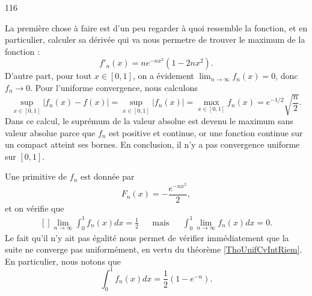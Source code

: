 

\begin{corrige}{116}

La première chose à faire est d'un peu regarder à quoi ressemble la fonction, et en particulier, calculer sa dérivée qui va nous permetre de trouver le maximum de la fonction :
\begin{equation}
	f'_n(x)=n e^{-nx^2}(1-2nx^2).
\end{equation}
D'autre part, pour tout $x\in[0,1]$, on a évidement $\lim_{n\to\infty}f_n(x)=0$, donc $f_n\to 0$. Pour l'uniforme convergence, nous calculons
\begin{equation}
	\sup_{x\in[0,1]}| f_n(x)-f(x) |=\sup_{x\in[0,1]}| f_n(x) |=\max_{x\in[0,1]}f_n(x)= e^{-1/2}\sqrt{\frac{ n }{ 2 }}.
\end{equation}
Dans ce calcul, le suprémum de la valeur absolue est devenu le maximum sans valeur absolue parce que $f_n$ est positive et continue, or une fonction continue sur un compact atteint ses bornes. En conclusion, il n'y a pas convergence uniforme sur $[0,1]$.

Une primitive de $f_n$ est donnée par
\begin{equation}
	F_n(x)=-\frac{  e^{-nx^2} }{2},
\end{equation}
et on vérifie que 
\begin{equation}
	\begin{aligned}[]
		\lim_{n\to\infty}\int_0^1f_n(x)dx=\frac{ 1 }{2}	&&	\text{mais}	&&	\int_0^1\lim_{n\to\infty}f_n(x)dx=0.
	\end{aligned}
\end{equation}
Le fait qu'il n'y ait pas égalité nous permet de vérifier immédiatement que la suite ne converge pas uniformément, en vertu du théorème \ref{ThoUnifCvIntRiem}. En particulier, nous notons que
\begin{equation}		\label{Eqintfexpemoin}
	\int_0^1f_n(x)dx= \frac{ 1 }{2}(1- e^{-n}).
\end{equation}

\end{corrige}
